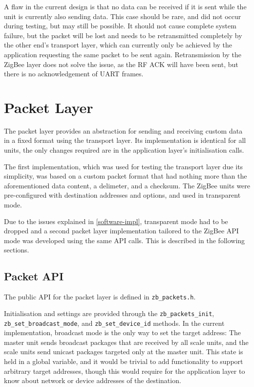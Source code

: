A flaw in the current design is that no data can be received if it is sent while the unit is currently also sending data. This case should be rare, and did not occur during testing, but may still be possible. It should not cause complete system failure, but the packet will be lost and needs to be retransmitted completely by the other end's transport layer, which can currently only be achieved by the application requesting the same packet to be sent again. Retransmission by the ZigBee layer does not solve the issue, as the RF ACK will have been sent, but there is no acknowledgement of UART frames. %

\section{Packet Layer}
The packet layer provides an abstraction for sending and receiving custom data in a fixed format using the transport layer. Its implementation is identical for all units, the only changes required are in the application layer's initialisation calls.

The first implementation, which was used for testing the transport layer due its simplicity, was based on a custom packet format that had nothing more than the aforementioned data content, a delimeter, and a checksum. The ZigBee units were pre-configured with destination addresses and options, and used in transparent mode.

Due to the issues explained in \ref{software-impl}, transparent mode had to be dropped and a second packet layer implementation tailored to the ZigBee API mode was developed using the same API calls. This is described in the following sections. 

\subsection{Packet API}
The public API for the packet layer is defined in \texttt{zb\_packets.h}. 

Initialisation and settings are provided through the \texttt{zb\_packets\_init}, \texttt{zb\_set\_broadcast\_mode}, and \texttt{zb\_set\_device\_id} methods. In the current implementation, broadcast mode is the only way to set the target address: The master unit sends broadcast packages that are received by all scale units, and the scale units send unicast packages targeted only at the master unit. This state is held in a global variable, and it would be trivial to add functionality to support arbitrary target addresses, though this would require for the application layer to know about network or device addresses of the destination.

